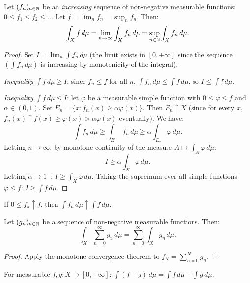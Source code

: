 \begin{theorem}
\label{thm:monotone_convergence}
Let $(f_n)_{n \in \mathbb{N}}$ be an \emph{increasing} sequence of non-negative measurable
functions: $0 \leq f_1 \leq f_2 \leq \ldots$ Let $f = \lim_n f_n = \sup_n f_n$.
Then:
\[
\int_X f\, d\mu = \lim_{n \to \infty} \int_X f_n\, d\mu
= \sup_{n \in \mathbb{N}} \int_X f_n\, d\mu.
\]
\end{theorem}

\begin{proof}
Set $I = \lim_n \int f_n\, d\mu$ (the limit exists in $[0, +\infty]$ since the
sequence $(\int f_n\, d\mu)$ is increasing by monotonicity of the integral).

\emph{Inequality $\int f\, d\mu \geq I$}: since $f_n \leq f$ for all $n$,
$\int f_n\, d\mu \leq \int f\, d\mu$, so $I \leq \int f\, d\mu$.

\emph{Inequality $\int f\, d\mu \leq I$}: let $\varphi$ be a measurable simple
function with $0 \leq \varphi \leq f$ and $\alpha \in (0, 1)$. Set
$E_n = \{x : f_n(x) \geq \alpha \varphi(x)\}$. Then $E_n \uparrow X$ (since for
every $x$, $f_n(x) \uparrow f(x) \geq \varphi(x) > \alpha \varphi(x)$ eventually).
We have:
\[
\int f_n\, d\mu \geq \int_{E_n} f_n\, d\mu \geq \alpha \int_{E_n} \varphi\, d\mu.
\]
Letting $n \to \infty$, by monotone continuity of the measure
$A \mapsto \int_A \varphi\, d\mu$:
\[
I \geq \alpha \int_X \varphi\, d\mu.
\]
Letting $\alpha \to 1^-$: $I \geq \int_X \varphi\, d\mu$. Taking the supremum over
all simple functions $\varphi \leq f$: $I \geq \int f\, d\mu$.
\end{proof}

\begin{keyformulas}[title=\textbf{Monotone convergence}]
If $0 \leq f_n \uparrow f$, then
$\displaystyle\int f_n\, d\mu \uparrow \int f\, d\mu$.
\end{keyformulas}

\begin{corollary}
Let $(g_n)_{n \in \mathbb{N}}$ be a sequence of non-negative measurable functions. Then:
\[
\int_X \sum_{n=0}^{\infty} g_n\, d\mu = \sum_{n=0}^{\infty} \int_X g_n\, d\mu.
\]
\end{corollary}

\begin{proof}
Apply the monotone convergence theorem to $f_N = \sum_{n=0}^N g_n$.
\end{proof}

\begin{corollary}
For measurable $f, g : X \to [0, +\infty]$:
$\int (f + g)\, d\mu = \int f\, d\mu + \int g\, d\mu$.
\end{corollary}


